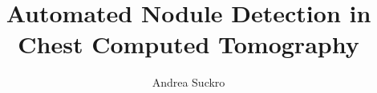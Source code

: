 \documentclass[11pt, oneside, openright, utf8, master, english, subfiles]{base/thesis}
\institute{Institute of Cognitive Science}
\title{Automated Nodule Detection in Chest Computed Tomography}
\author{Andrea Suckro}
\begin{document}
\maketitle

\begin{abstract}

\end{abstract}


\tableofcontents

\mainpart







\appendix

\listoffigures
\listofalgorithms
\nocite{*}



\declaration
\end{document}
